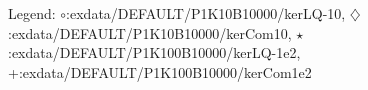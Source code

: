 Legend: {\color{CornflowerBlue}$\circ$}:exdata/DEFAULT/P1K10B10000/kerLQ-10, {\color{Orange}$\diamondsuit$}:exdata/DEFAULT/P1K10B10000/kerCom10, {\color{Green}$\star$}:exdata/DEFAULT/P1K100B10000/kerLQ-1e2, {\color{red}+}:exdata/DEFAULT/P1K100B10000/kerCom1e2